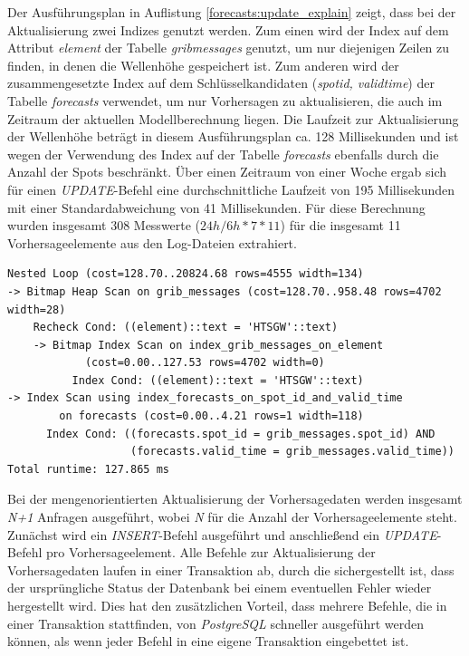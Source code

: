 Der Ausführungsplan in Auflistung \ref{forecasts:update_explain}
zeigt, dass bei der Aktualisierung zwei Indizes genutzt werden. Zum
einen wird der Index auf dem Attribut \textit{element} der Tabelle
\textit{grib\textunderscore messages} genutzt, um nur diejenigen
Zeilen zu finden, in denen die Wellenhöhe gespeichert ist. Zum anderen
wird der zusammengesetzte Index auf dem Schlüsselkandidaten
(\textit{spot\textunderscore id, valid\textunderscore time}) der
Tabelle \textit{forecasts} verwendet, um nur Vorhersagen zu
aktualisieren, die auch im Zeitraum der aktuellen Modellberechnung
liegen. Die Laufzeit zur Aktualisierung der Wellenhöhe beträgt in
diesem Ausführungsplan ca. 128 Millisekunden und ist wegen der
Verwendung des Index auf der Tabelle \textit{forecasts} ebenfalls
durch die Anzahl der Spots beschränkt. Über einen Zeitraum von einer
Woche ergab sich für einen \textit{UPDATE}-Befehl eine
durchschnittliche Laufzeit von 195 Millisekunden mit einer
Standardabweichung von 41 Millisekunden. Für diese Berechnung wurden
insgesamt 308 Messwerte ($24h/6h * 7 * 11$) für die insgesamt 11
Vorhersageelemente aus den Log-Dateien extrahiert.

\begin{lstlisting}[captionpos=b, caption=Ausführungsplan der Aktualisierung, label=forecasts:update_explain]
Nested Loop (cost=128.70..20824.68 rows=4555 width=134)
-> Bitmap Heap Scan on grib_messages (cost=128.70..958.48 rows=4702 width=28)
    Recheck Cond: ((element)::text = 'HTSGW'::text)
    -> Bitmap Index Scan on index_grib_messages_on_element 
            (cost=0.00..127.53 rows=4702 width=0)
          Index Cond: ((element)::text = 'HTSGW'::text)
-> Index Scan using index_forecasts_on_spot_id_and_valid_time 
        on forecasts (cost=0.00..4.21 rows=1 width=118)
      Index Cond: ((forecasts.spot_id = grib_messages.spot_id) AND
                   (forecasts.valid_time = grib_messages.valid_time))
Total runtime: 127.865 ms
\end{lstlisting}

Bei der mengenorientierten Aktualisierung der Vorhersagedaten werden
insgesamt \textit{N+1} Anfragen ausgeführt, wobei \textit{N} für die
Anzahl der Vorhersageelemente steht. Zunächst wird ein
\textit{INSERT}-Befehl ausgeführt und anschließend ein
\textit{UPDATE}-Befehl pro Vorhersageelement. Alle Befehle zur
Aktualisierung der Vorhersagedaten laufen in einer Transaktion ab,
durch die sichergestellt ist, dass der ursprüngliche Status der
Datenbank bei einem eventuellen Fehler wieder hergestellt wird. Dies
hat den zusätzlichen Vorteil, dass mehrere Befehle, die in einer
Transaktion stattfinden, von \textit{PostgreSQL} schneller ausgeführt
werden können, als wenn jeder Befehl in eine eigene Transaktion
eingebettet ist.

